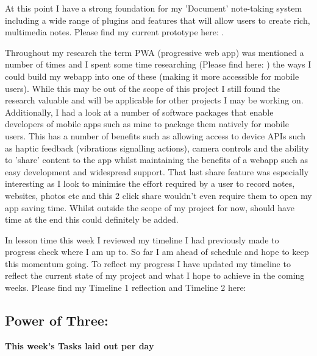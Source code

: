 At this point I have a strong foundation for my 'Document' note-taking system including a wide range of plugins and features that will allow users to create rich, multimedia notes. Please find my current prototype here: .

Throughout my research the term PWA (progressive web app) was mentioned a number of times and I spent some time researching (Please find here: ) the ways I could build my webapp into one of these (making it more accessible for mobile users). While this may be out of the scope of this project I still found the research valuable and will be applicable for other projects I may be working on. Additionally, I had a look at a number of software packages that enable developers of mobile apps such as mine to package them natively for mobile users. This has a number of benefits such as allowing access to device APIs such as haptic feedback (vibrations signalling actions), camera controls and the ability to 'share' content to the app whilst maintaining the benefits of a webapp such as easy development and widespread support. That last share feature was especially interesting as I look to minimise the effort required by a user to record notes, websites, photos etc and this 2 click share wouldn't even require them to open my app saving time. Whilst outside the scope of my project for now, should have time at the end this could definitely be added.

In lesson time this week I reviewed my timeline I had previously made to progress check where I am up to. So far I am ahead of schedule and hope to keep this momentum going. To reflect my progress I have updated my timeline to reflect the current state of my project and what I hope to achieve in the coming weeks. Please find my Timeline 1 reflection and Timeline 2 here: 


\subsection*{Power of Three:}
\textbf{This week's Tasks laid out per day}

